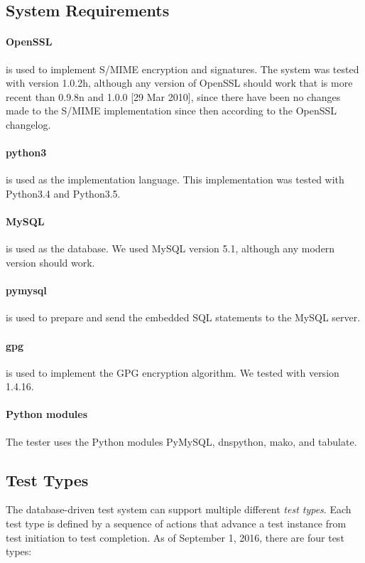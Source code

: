 \documentclass[preprint,3p]{elsarticle}
\begin{document}
\subsection{System Requirements}

\paragraph{OpenSSL} is used to implement S/MIME encryption and
signatures. The system was tested with version 1.0.2h, although any
version of OpenSSL should work that is more recent than 0.9.8n and
1.0.0 [29 Mar 2010], since there have been no changes made to the
S/MIME implementation since then according to the OpenSSL changelog. 

\paragraph{python3} is used as the implementation language. This
implementation was tested with Python3.4 and Python3.5. 

\paragraph{MySQL} is used as the database. We used MySQL version 5.1,
although any modern version should work. 

\paragraph{pymysql} is used to prepare and send the embedded SQL
statements to the MySQL server.

\paragraph{gpg} is used to implement the GPG encryption
algorithm. We tested with version 1.4.16.

\paragraph{Python modules} The tester uses the Python modules PyMySQL,
dnspython, mako, and tabulate.

\subsection{Test Types}
The database-driven test system can support multiple different
\emph{test types}. Each test type is defined by a sequence of actions
that advance a test instance from test initiation to test
completion. As of September 1, 2016, there are four test types:\\
\end{document}
